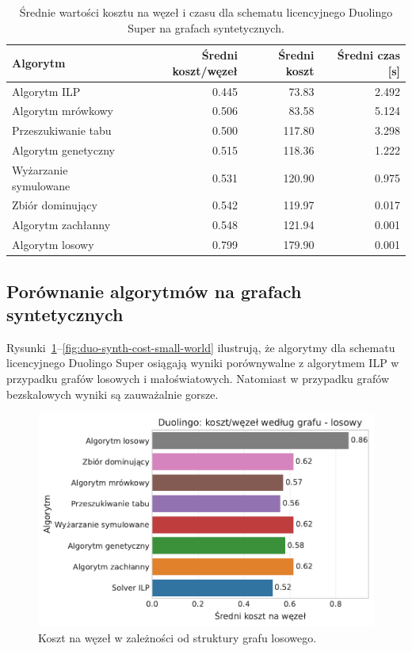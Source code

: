 \begin{table}[H]
  \centering
  \caption{Średnie wartości kosztu na węzeł i czasu dla schematu licencyjnego Duolingo Super na grafach syntetycznych.}
  \label{tab:duo-synth-summary}
  \begin{tabular}{lrrr}
    \toprule
    \textbf{Algorytm}     & \textbf{Średni koszt/węzeł} & \textbf{Średni koszt} & \textbf{Średni czas [s]} \\
    \midrule
    Algorytm ILP          & 0.445                       & 73.83                 & 2.492                    \\
    Algorytm mrówkowy     & 0.506                       & 83.58                 & 5.124                    \\
    Przeszukiwanie tabu   & 0.500                       & 117.80                & 3.298                    \\
    Algorytm genetyczny   & 0.515                       & 118.36                & 1.222                    \\
    Wyżarzanie symulowane & 0.531                       & 120.90                & 0.975                    \\
    Zbiór dominujący      & 0.542                       & 119.97                & 0.017                    \\
    Algorytm zachłanny    & 0.548                       & 121.94                & 0.001                    \\
    Algorytm losowy       & 0.799                       & 179.90                & 0.001                    \\
    \bottomrule
  \end{tabular}
\end{table}


\subsection{Porównanie algorytmów na grafach syntetycznych}

Rysunki~\ref{fig:duo-synth-cost-random}--\ref{fig:duo-synth-cost-small-world} ilustrują, że algorytmy dla schematu licencyjnego Duolingo Super osiągają wyniki porównywalne z algorytmem ILP w przypadku grafów losowych i małoświatowych. Natomiast w przypadku grafów bezskalowych wyniki są zauważalnie gorsze.


\begin{figure}[H]
  \centering
  \includegraphics[width=0.65\linewidth]{assets/figures/benchmark/synthetic/duolingo_cost_per_node_by_graph_random.pdf}
  \caption{Koszt na węzeł w zależności od struktury grafu losowego.}
  \label{fig:duo-synth-cost-random}
\end{figure}

